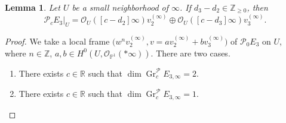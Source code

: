 \documentclass[10pt,a4paper]{amsart}
\numberwithin{equation}{section}
\newtheorem{Lemma}[Theorem]{Lemma}
\newcommand{\Z}{\mathbb{Z}}
\newcommand{\R}{\mathbb{R}}
\newcommand{\ps}{\mathbb{P}}
\newcommand{\strsheaf}{\mathcal{O}}
\newcommand{\gr}{\operatorname{\mathrm{Gr}}}
\begin{document}
\begin{Lemma}\label{case3}
 Let $U$ be a small neighborhood of $\infty$. If $d_3-d_2\in\Z_{\geq 0}$, then
 \begin{equation}\label{case3'}
 \mathcal{P}_{c}E_3|_{U} = \mathcal{O}_U([c-d_2]\infty)v^{(\infty)}_2 \oplus \mathcal{O}_U([c-d_3]\infty)v^{(\infty)}_3.
 \end{equation}
\end{Lemma}
\begin{proof}
 We take a local frame $\big(w^{n}v^{(\infty)}_2,v=av^{(\infty)}_2+bv^{(\infty)}_3\big)$ of $\mathcal{P}_{0} E_3$ on $U$, where $n\in \Z$, $a,b\in H^0(U,\strsheaf_{\ps^1}(*\infty))$. There are two cases.
 \begin{enumerate}\itemsep=0pt\setlength{\leftskip}{0.62cm}
 \item[\bf{Case 1.}] There exists $c\in\R$ such that $\dim \gr^{\mathcal{P}}_{c} E_{3,\infty}=2$.
 \item[\bf{Case 2.}] There exists $c\in\R$ such that $\dim \gr^{\mathcal{P}}_{c} E_{3,\infty}=1$.
 \end{enumerate}


\end{proof}
\end{document}
